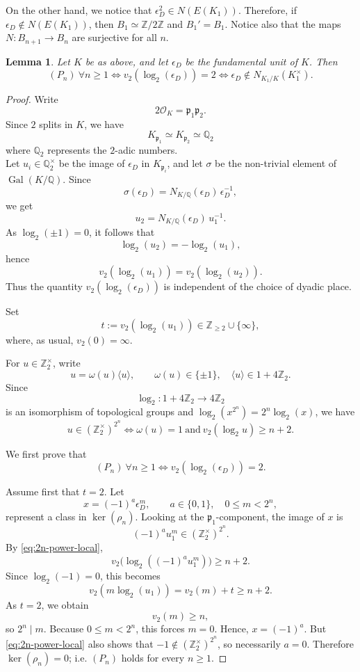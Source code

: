 \documentclass{article}
\numberwithin{equation}{section}
\theoremstyle{plain}  %
\newtheorem{lemma}{Lemma}[section]
\theoremstyle{definition}
\newcommand{\Z}{\mathbb{Z}}
\newcommand{\Q}{\mathbb{Q}}
\DeclareMathOperator{\Gal}{Gal}
\newcommand{\fk}{\mathfrak }
\begin{document}
On the other hand, we notice that $\epsilon_D^2 \in N(E(K_1))$. Therefore, if $\epsilon_D \not \in N(E(K_1))$, then $B_1 \simeq \Z/2\Z$ and $B_1'=B_1$.  Notice also that the maps $N:B_{n+1}\to B_n$ are surjective for all $n$. 



\begin{lemma} \label{lem: property P_n}
Let $K$ be as above, and let $\epsilon_D$ be the fundamental unit of $K$.
Then
$$
(P_n)\ \forall n\ge 1
\iff
v_2(\log_2(\epsilon_D))=2
\iff
\epsilon_D\notin N_{K_1/K}(K_1^\times).
$$
\end{lemma}

\begin{proof}
Write
$$
2\mathcal O_K=\fk p_1\fk p_2.
$$
Since $2$ splits in $K$, we have
$$
K_{\fk p_1}\simeq K_{\fk p_2}\simeq \Q_2
$$ 
where $\Q_2$ represents the $2$-adic numbers.\\

Let $u_i\in \Q_2^\times$ be the image of $\epsilon_D$ in $K_{\fk p_i}$, and let
$\sigma$ be the non-trivial element of $\Gal(K/\mathbb Q)$. Since
$$
\sigma(\epsilon_D)=N_{K/\mathbb Q}(\epsilon_D)\,\epsilon_D^{-1},
$$
we get
$$
u_2=N_{K/\mathbb Q}(\epsilon_D)\,u_1^{-1}.
$$
As $\log_2(\pm 1)=0$, it follows that
$$
\log_2(u_2)=-\log_2(u_1),
$$
hence
$$
v_2(\log_2(u_1))=v_2(\log_2(u_2)).
$$
Thus the quantity $v_2(\log_2(\epsilon_D))$ is independent of the choice of dyadic place.

Set
$$
t:=v_2(\log_2(u_1))\in \Z_{\ge 2}\cup\{\infty\},
$$
where, as usual, $v_2(0)=\infty$.

For $u\in \Z_2^\times$, write
$$
u=\omega(u)\langle u\rangle,
\qquad
\omega(u)\in\{\pm1\},\quad \langle u\rangle\in 1+4\Z_2.
$$
Since
$$
\log_2:1+4\Z_2\longrightarrow 4\Z_2
$$
is an isomorphism of topological groups and $\log_2(x^{2^n})=2^n\log_2(x)$, we have
\begin{equation}\label{eq:2n-power-local}
u\in (\Z_2^\times)^{2^n}
\iff
\omega(u)=1\ \text{and}\ v_2(\log_2 u)\ge n+2.
\end{equation}

We first prove that
$$
(P_n)\ \forall n\ge 1
\iff
v_2(\log_2(\epsilon_D))=2.
$$



Assume first that $t=2$. Let
$$
x=(-1)^a\epsilon_D^m,
\qquad a\in\{0,1\},\quad 0\le m<2^n,
$$
represent a class in $\ker(\rho_n)$. Looking at the $\fk p_1$-component, the image of $x$ is
$$
(-1)^a u_1^m\in (\Z_2^\times)^{2^n}.
$$
By \eqref{eq:2n-power-local},
$$
v_2\!\bigl(\log_2((-1)^a u_1^m)\bigr)\ge n+2.
$$
Since $\log_2(-1)=0$, this becomes
$$
v_2(m\log_2(u_1))=v_2(m)+t\ge n+2.
$$
As $t=2$, we obtain
$$
v_2(m)\ge n,
$$
so $2^n\mid m$. Because $0\le m<2^n$, this forces $m=0$. Hence, $x=(-1)^a$.
But \eqref{eq:2n-power-local} also shows that $-1\notin (\Z_2^\times)^{2^n}$, so necessarily $a=0$.
Therefore $\ker(\rho_n)=0$; i.e. $(P_n)$ holds for every $n\ge 1$.


\end{proof}
\end{document}

